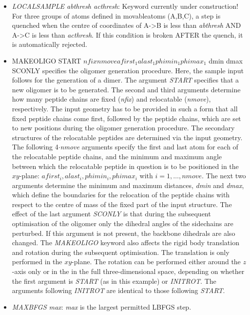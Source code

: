 \documentclass[12pt,a4paper,dvips]{article}
\begin{document}
\begin{itemize}
\item {\it LOCALSAMPLE abthresh acthresh\/}: Keyword currently under construction! For three groups of atoms defined in movableatoms
(A,B,C), a step is quenched when the centre of coordinates of A->B is less than {\it abthresh} AND A->C is less than {\it acthresh}. 
If this condition is broken AFTER the quench, it is automatically rejected.

\item MAKEOLIGO START $nfix nmove afirst_1 alast_1 phimin_1 phimax_1$ dmin dmax SCONLY
specifies the oligomer generation procedure. Here, the sample input follows for the generation of a dimer.
The argument \textit{START} specifies that a new oligomer is to be generated.
The second and third arguments determine how many peptide chains are fixed ({\it nfix}) and relocatable ({\it nmove}), respectively.
The input geometry has
to be provided in such a form that all fixed peptide chains come first, followed by the peptide chains,
which are set to
new positions during the oligomer generation procedure. The secondary structures of the relocatable peptides are determined via the input
geometry. The following 4$\cdot${\it nmove} arguments specify the first and last atom for each of the relocatable peptide chains, and the
minimum and maximum angle between which the relocatable peptide in question is to be positioned in the $xy$-plane:
$afirst_i, alast_i, phimin_i, phimax_i$ with $i=1,\ldots,nmove$.
The next two arguments determine the minimum and maximum distances, {\it dmin} and {\it dmax}, which define the boundaries
for the relocation of the peptide chains with respect to the centre of mass of the fixed part of the input structure.
The effect of the last argument \textit{SCONLY} is that during the subsequent optimisation of the oligomer only the dihedral angles
of the sidechains are perturbed. If this argument is not present, the backbone dihedrals are also changed.
The \textit{MAKEOLIGO} keyword also affects the rigid body translation and rotation during the subsequent optimisation. The translation is
only performed in the $xy$-plane. The rotation can be performed either around the $z$-axis only or in the in the full three-dimensional
space, depending on whether the first argument is \textit{START} (as in this example) or \textit{INITROT}. The arguments following
\textit{INITROT} are identical to those following \textit{START}.

\item {\it MAXBFGS max\/}: {\it max\/} is the largest permitted LBFGS step.


\end{itemize}
\end{document}
